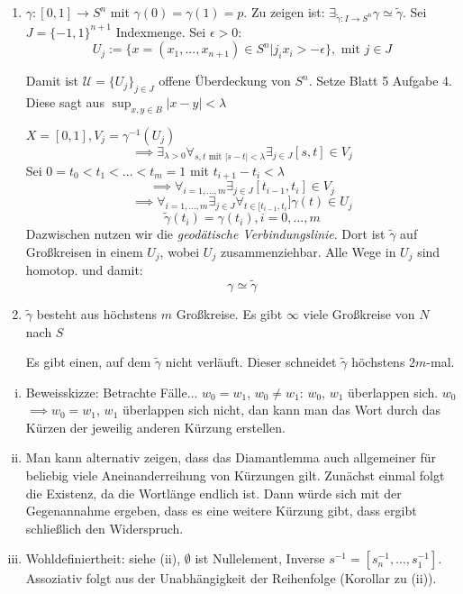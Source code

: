 \documentclass{scrartcl}
\begin{document}
\begin{aufgabe}
 \begin{enumerate}[i]
  \item $\gamma: [0,1] \to S^n$ mit $\gamma(0)=\gamma(1)=p$. Zu zeigen ist: $\exists_{\tilde \gamma: I \to S^n} \gamma \simeq \tilde \gamma $. Sei $J=\{-1,1\}^{n+1}$ Indexmenge. Sei $\epsilon>0$:
\[
 U_j:= \{x=(x_1,...,x_{n+1}) \in S^n|j_i x_i > - \epsilon\}, \text{ mit } j \in J
\]

Damit ist $\mathcal U = \{U_j\}_{j\in J}$ offene Überdeckung von $S^n$. Setze Blatt 5 Aufgabe 4. Diese sagt aus $\sup_{x,y\in B} |x-y|<\lambda$ 

$X=[0,1], V_j=\gamma^{-1}(U_j)$
\[
 \implies \exists_{\lambda>0} \forall_{s,t \text{ mit } |s-t|<\lambda}\exists_{j\in J} [s,t] \in V_j
\]
Sei $0=t_0 < t_1 < ... < t_m=1$ mit $t_{i+1}-t_i < \lambda$
\[
 \implies \forall_{i=1,..., m} \exists_{j\in J} [t_{i-1}, t_i]\in V_j
\]
\[
 \implies \forall_{i=1,..., m} \exists_{j\in J} \forall_{t\in [t_{i-1}, t_i}] \gamma(t) \in U_j
\]
\[
 \tilde \gamma(t_i)=\gamma(t_i), i=0,..., m
\]
Dazwischen nutzen wir die \emph{geodätische Verbindungslinie}. Dort ist $\tilde \gamma$ auf Großkreisen in einem $U_j$, wobei $U_j$ zusammenziehbar. Alle Wege in $U_j$ sind homotop. und damit:
\[
 \gamma \simeq \tilde \gamma
\]



\item $\tilde \gamma$ besteht  aus höchstens $m$ Großkreise. Es gibt $\infty$ viele Großkreise von $N$ nach $S$


Es gibt einen, auf dem $\tilde \gamma$ nicht verläuft. Dieser schneidet $\tilde \gamma$ höchstens $2m$-mal.
 \end{enumerate}
\end{aufgabe}
\begin{aufgabe}
 \begin{enumerate}[(i)]
  \item Beweisskizze: Betrachte Fälle...  $w_0=w_1$, $w_0\neq w_1$: $w_0$, $w_1$ überlappen sich.  $w_0$ $\implies w_0=w_1$, $w_1$ überlappen sich nicht, dan kann man das Wort durch das Kürzen der jeweilig anderen Kürzung erstellen.
  \item Man kann alternativ zeigen, dass das Diamantlemma auch allgemeiner für beliebig viele Aneinanderreihung von Kürzungen gilt. Zunächst einmal folgt die Existenz, da die Wortlänge endlich ist. Dann würde sich mit der Gegenannahme ergeben, dass es eine weitere Kürzung gibt, dass ergibt schließlich den Widerspruch.
  \item Wohldefiniertheit: siehe (ii), $\emptyset$ ist Nullelement, Inverse $s^{-1}=[s_n^{-1}, ..., s_1^{-1}]$. Assoziativ folgt aus der Unabhängigkeit der Reihenfolge (Korollar zu (ii)). 
 \end{enumerate}

\end{aufgabe}
\end{document}

